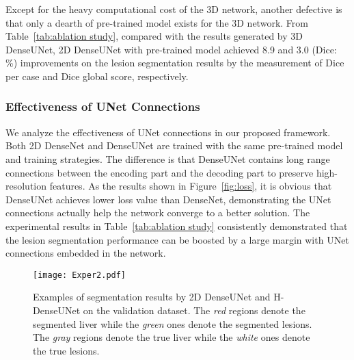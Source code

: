 \documentclass[journal]{IEEEtran}
\begin{document}
Except for the heavy computational cost of the 3D network, another defective is that only a dearth of pre-trained model exists for the 3D network.
From Table~\ref{tab:ablation study}, compared with the results generated by 3D DenseUNet, 2D DenseUNet with pre-trained model achieved 8.9 and 3.0 (Dice: \%) improvements on the lesion segmentation results by the measurement of Dice per case and Dice global score, respectively. \subsubsection{Effectiveness of UNet Connections}

We analyze the effectiveness of UNet connections in our proposed framework. Both 2D DenseNet and DenseUNet are trained with the same pre-trained model and training strategies. The difference is that DenseUNet contains long range connections between the encoding part and the decoding part to preserve high-resolution features. As the results shown in Figure~\ref{fig:loss}, it is obvious that DenseUNet achieves lower loss value than DenseNet, demonstrating the UNet connections actually help the network converge to a better solution. The experimental results in Table~\ref{tab:ablation study} consistently demonstrated that the lesion segmentation performance can be boosted by a large margin with UNet connections embedded in the network.
\begin{figure}[!t]
	\centering
	\texttt{[image: Exper2.pdf]}
	\caption{Examples of segmentation results by 2D DenseUNet and H-DenseUNet on the validation dataset. The \emph{red} regions denote the segmented liver while the \emph{green} ones denote the segmented lesions. The \emph{gray} regions denote the true liver while the \emph{white} ones denote the true lesions.}
	\label{fig:exam}\centering
\end{figure}
\end{document}
